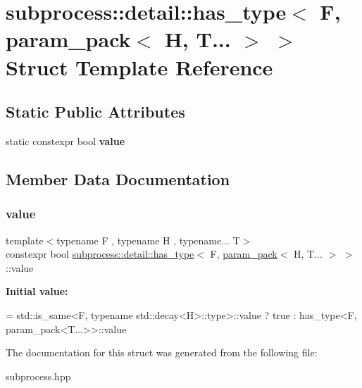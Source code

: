 \hypertarget{structsubprocess_1_1detail_1_1has__type_3_01F_00_01param__pack_3_01H_00_01T_8_8_8_01_4_01_4}{}\section{subprocess\+:\+:detail\+:\+:has\+\_\+type$<$ F, param\+\_\+pack$<$ H, T... $>$ $>$ Struct Template Reference}
\label{structsubprocess_1_1detail_1_1has__type_3_01F_00_01param__pack_3_01H_00_01T_8_8_8_01_4_01_4}
\subsection*{Static Public Attributes}
\begin{DoxyCompactItemize}
\item 
static constexpr bool {\bfseries value}
\end{DoxyCompactItemize}


\subsection{Member Data Documentation}
\mbox{\label{structsubprocess_1_1detail_1_1has__type_3_01F_00_01param__pack_3_01H_00_01T_8_8_8_01_4_01_4_a829019a12ddee4513ab080d5c16b3d31}} 
\subsubsection{\texorpdfstring{value}{value}}
{\footnotesize\ttfamily template$<$typename F , typename H , typename... T$>$ \\
constexpr bool \hyperlink{structsubprocess_1_1detail_1_1has__type}{subprocess\+::detail\+::has\+\_\+type}$<$ F, \hyperlink{structsubprocess_1_1detail_1_1param__pack}{param\+\_\+pack}$<$ H, T... $>$ $>$\+::value\hspace{0.3cm}{\ttfamily [static]}}

{\bfseries Initial value\+:}
\begin{DoxyCode}
=
    std::is\_same<F, typename std::decay<H>::type>::value ? true : has\_type<F, param\_pack<T...>>::value
\end{DoxyCode}


The documentation for this struct was generated from the following file\+:\begin{DoxyCompactItemize}
\item 
subprocess.\+hpp\end{DoxyCompactItemize}
